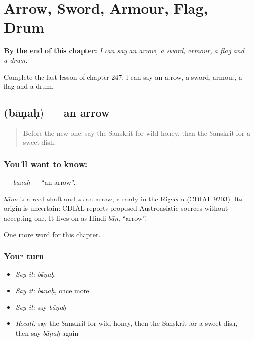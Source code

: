 
\chapter{Arrow, Sword, Armour, Flag, Drum}
\label{ch:sa-arrow-sword-armour-flag-drum}

\begin{chapteropening}
\textbf{By the end of this chapter:} \emph{I can say an arrow, a sword, armour, a flag and a drum.}

Complete the last lesson of chapter 247: I can say an arrow, a sword, armour, a flag and a drum.
\end{chapteropening}

\section[\texorpdfstring{\sk{बाणः} (bāṇaḥ)}{बाणः (bāṇaḥ)}]{ (bāṇaḥ) — an arrow}

\label{lesson:SA-C247-banah}



\begin{quote}
Before the new one: say the Sanskrit for wild honey, then the Sanskrit for a sweet dish.
\end{quote}

\subsection*{You'll want to know: }
\textbf{} — \emph{bāṇaḥ} — \textquotedblleft{}an arrow\textquotedblright{}.

\begin{cousinweb}
\emph{bāṇa} is a reed-shaft and so an arrow, already in the Rigveda (CDIAL 9203). Its origin is uncertain: CDIAL reports proposed Austroasiatic sources without accepting one. It lives on as Hindi \emph{bān}, \textquotedblleft{}arrow\textquotedblright{}.
\end{cousinweb}

\begin{grammarlens}[title={What you've built}]
One more word for this chapter.
\end{grammarlens}

\subsection*{Your turn}
\begin{itemize}
\raggedright
  \item \emph{Say it:} \emph{bāṇaḥ}
  \item \emph{Say it:} \emph{bāṇaḥ}, once more
  \item \emph{Say it:} say \emph{bāṇaḥ}
  \item \emph{Recall:} say the Sanskrit for wild honey, then the Sanskrit for a sweet dish, then say \emph{bāṇaḥ} again
\end{itemize}

